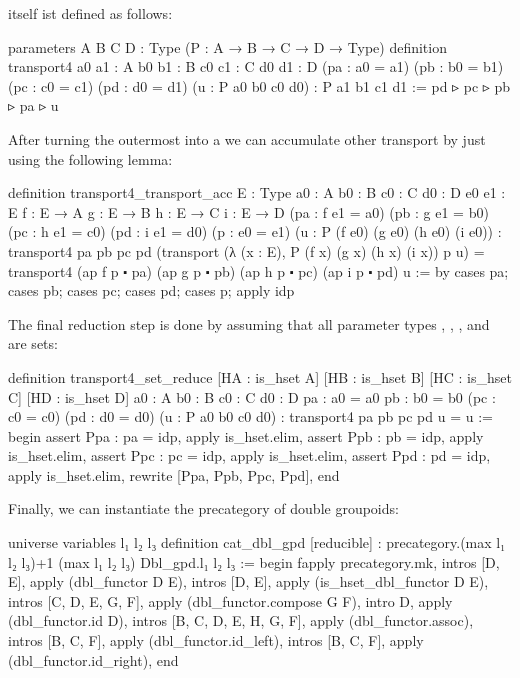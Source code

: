  itself ist defined as follows:
\begin{leancode}
  parameters {A B C D : Type} (P : A → B → C → D → Type)
  definition transport4 {a0 a1 : A} {b0 b1 : B} {c0 c1 : C} {d0 d1 : D}
    (pa : a0 = a1) (pb : b0 = b1) (pc : c0 = c1) (pd : d0 = d1)
    (u : P a0 b0 c0 d0) : P a1 b1 c1 d1 :=
  pd ▹ pc ▹ pb ▹ pa ▹ u
\end{leancode}

After turning the outermost  into a  we can
accumulate other transport by just using the following lemma:
\begin{leancode}
  definition transport4_transport_acc {E : Type}
    {a0 : A} {b0 : B} {c0 : C} {d0 : D}
    {e0 e1 : E} {f : E → A} {g : E → B} {h : E → C} {i : E → D}
    (pa : f e1 = a0) (pb : g e1 = b0) (pc : h e1 = c0) (pd : i e1 = d0)
    (p : e0 = e1) (u : P (f e0) (g e0) (h e0) (i e0)) :
  transport4 pa pb pc pd (transport (λ (x : E), P (f x) (g x) (h x) (i x)) p u)
  = transport4 (ap f p ⬝ pa) (ap g p ⬝ pb) (ap h p ⬝ pc) (ap i p ⬝ pd) u :=
  by cases pa; cases pb; cases pc; cases pd; cases p; apply idp
\end{leancode}

The final reduction step is done by assuming that all parameter types ,
, , and  are sets:
\begin{leancodebr}
  definition transport4_set_reduce [HA : is_hset A] [HB : is_hset B]
    [HC : is_hset C] [HD : is_hset D]
    {a0 : A} {b0 : B} {c0 : C} {d0 : D}
    {pa : a0 = a0} {pb : b0 = b0} (pc : c0 = c0) (pd : d0 = d0)
    (u : P a0 b0 c0 d0) :
    transport4 pa pb pc pd u = u :=
  begin
    assert Ppa : pa = idp, apply is_hset.elim,
    assert Ppb : pb = idp, apply is_hset.elim,
    assert Ppc : pc = idp, apply is_hset.elim,
    assert Ppd : pd = idp, apply is_hset.elim,
    rewrite [Ppa, Ppb, Ppc, Ppd],
  end
\end{leancodebr}

Finally, we can instantiate the precategory of double groupoids:
\begin{leancodebr}
  universe variables l₁ l₂ l₃
  definition cat_dbl_gpd [reducible] :
    precategory.{(max l₁ l₂ l₃)+1 (max l₁ l₂ l₃)} Dbl_gpd.{l₁ l₂ l₃} :=
  begin
    fapply precategory.mk,
      intros [D, E], apply (dbl_functor D E),
      intros [D, E], apply (is_hset_dbl_functor D E),
      intros [C, D, E, G, F], apply (dbl_functor.compose G F),
      intro D, apply (dbl_functor.id D),
      intros [B, C, D, E, H, G, F], apply (dbl_functor.assoc),
      intros [B, C, F], apply (dbl_functor.id_left),
      intros [B, C, F], apply (dbl_functor.id_right),
  end
\end{leancodebr}

